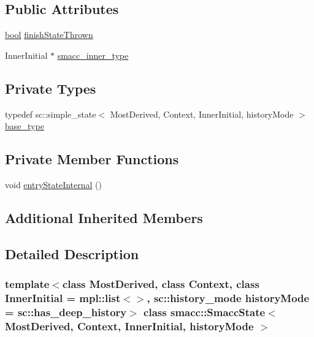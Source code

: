 \subsection*{Public Attributes}
\begin{DoxyCompactItemize}
\item 
\hyperlink{classbool}{bool} \hyperlink{classsmacc_1_1SmaccState_a6c40f733c35ddfb9ae2a2f8e9bab07d3}{finish\+State\+Thrown}
\item 
Inner\+Initial $\ast$ \hyperlink{classsmacc_1_1SmaccState_a087d0f66729b98614feb8c59ea548af1}{smacc\+\_\+inner\+\_\+type}
\end{DoxyCompactItemize}
\subsection*{Private Types}
\begin{DoxyCompactItemize}
\item 
typedef sc\+::simple\+\_\+state$<$ Most\+Derived, Context, Inner\+Initial, history\+Mode $>$ \hyperlink{classsmacc_1_1SmaccState_a68f547c6fe147554bbe607b6fcd8e40a}{base\+\_\+type}
\end{DoxyCompactItemize}
\subsection*{Private Member Functions}
\begin{DoxyCompactItemize}
\item 
void \hyperlink{classsmacc_1_1SmaccState_a084b95d0cb856d048fdb5ce81400eec7}{entry\+State\+Internal} ()
\end{DoxyCompactItemize}
\subsection*{Additional Inherited Members}


\subsection{Detailed Description}
\subsubsection*{template$<$class Most\+Derived, class Context, class Inner\+Initial = mpl\+::list$<$$>$, sc\+::history\+\_\+mode history\+Mode = sc\+::has\+\_\+deep\+\_\+history$>$\newline
class smacc\+::\+Smacc\+State$<$ Most\+Derived, Context, Inner\+Initial, history\+Mode $>$}



